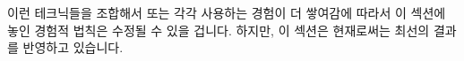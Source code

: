 이런 테크닉들을 조합해서 또는 각각 사용하는 경험이 더 쌓여감에 따라서 이 섹션에
놓인 경험적 법칙은 수정될 수 있을 겁니다.
하지만, 이 섹션은 현재로써는 최선의 결과를 반영하고 있습니다.
\iffalse

As more experience is gained using these techniques, both separately
and in combination, the rules of thumb laid out in this section will
need to be refined.
However, this section does reflect the current state of the art.
\fi
